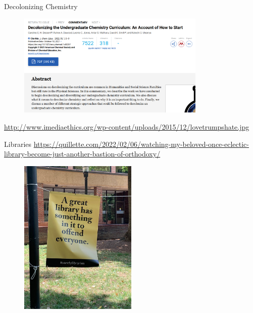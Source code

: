 \documentclass{simple}
\begin{document}
\begin{frame}{Decolonizing Chemistry}
  \begin{figure}
    \centering
    \pause
    \includegraphics[width=0.8\textwidth]{img/decolonizing-chemistry.png}
  \end{figure}
  \begin{center}
    \tiny
    \url{http://www.imediaethics.org/wp-content/uploads/2015/12/lovetrumpshate.jpg}
  \end{center}
\end{frame}

\begin{frame}{Libraries}
  {\tiny
  \url{https://quillette.com/2022/02/06/watching-my-beloved-once-eclectic-library-become-just-another-bastion-of-orthodoxy/}
  }
  \begin{figure}
    \centering
    \pause
    \includegraphics[width=0.5\textwidth]{img/library-offend.jpg}
  \end{figure}
\end{frame}
\end{document}
